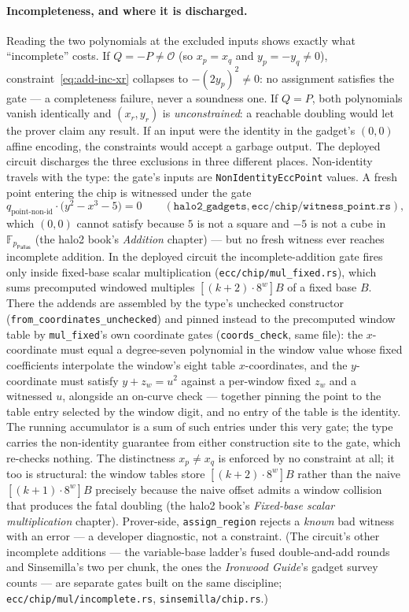 \documentclass[11pt,a4paper]{article}
\theoremstyle{definition}
\newcommand{\F}{\mathbb{F}}
\newcommand{\Pallas}{\ensuremath{\mathsf{Pallas}}}
\begin{document}
\paragraph{Incompleteness, and where it is discharged.}
Reading the two polynomials at the excluded inputs shows exactly what
``incomplete'' costs. If $Q = -P \neq \mathcal{O}$ (so $x_p = x_q$ and
$y_p = -y_q \neq 0$), constraint~\eqref{eq:add-inc-xr} collapses to
$-(2 y_p)^2 \neq 0$: no assignment satisfies the gate --- a completeness
failure, never a soundness one. If $Q = P$, both polynomials vanish
identically and $(x_r, y_r)$ is \emph{unconstrained}: a reachable doubling
would let the prover claim any result. If an input were the identity in the
gadget's $(0,0)$ affine encoding, the constraints would accept a garbage
output. The deployed circuit discharges the three exclusions in three
different places. Non-identity travels with the type: the gate's inputs
are \texttt{NonIdentityEccPoint} values. A fresh point entering the chip
is witnessed under the gate
\[
q_{\text{point-non-id}} \cdot \bigl( y^2 - x^3 - 5 \bigr) = 0
\qquad
(\texttt{halo2\_gadgets}, \texttt{ecc/chip/witness\_point.rs}),
\]
which $(0,0)$ cannot satisfy because $5$ is not a square and $-5$ is not a
cube in $\F_{p_{\Pallas}}$ (the halo2 book's \emph{Addition} chapter) ---
but no fresh witness ever reaches incomplete addition. In the deployed
circuit the incomplete-addition gate fires only inside fixed-base scalar
multiplication (\texttt{ecc/chip/mul\_fixed.rs}), which sums precomputed
windowed multiples $[(k+2) \cdot 8^w]B$ of a fixed base $B$. There the
addends are assembled by the type's unchecked constructor
(\texttt{from\_coordinates\_unchecked}) and pinned instead to the
precomputed window table by \texttt{mul\_fixed}'s own coordinate gates
(\texttt{coords\_check}, same file): the $x$-coordinate must equal a
degree-seven polynomial in the window value whose fixed coefficients
interpolate the window's eight table $x$-coordinates, and the
$y$-coordinate must satisfy $y + z_w = u^2$ against a per-window fixed
$z_w$ and a witnessed $u$, alongside an on-curve check --- together
pinning the point to the table entry selected by the window digit, and no
entry of the table is the identity. The running accumulator is a sum of
such entries under this very gate; the type carries the non-identity
guarantee from either construction site to the gate, which re-checks
nothing. The distinctness $x_p \neq x_q$ is enforced by no constraint at
all; it too is structural: the window tables store $[(k+2) \cdot 8^w]B$
rather than the naive $[(k+1) \cdot 8^w]B$ precisely because the naive
offset admits a window collision that produces the fatal doubling (the
halo2 book's \emph{Fixed-base scalar multiplication} chapter).
Prover-side, \texttt{assign\_region} rejects a \emph{known} bad witness
with an error --- a developer diagnostic, not a constraint. (The
circuit's other incomplete additions --- the variable-base
ladder's fused double-and-add rounds and Sinsemilla's two per chunk, the
ones the \emph{Ironwood Guide}'s gadget survey counts --- are separate gates
built on the same discipline; \texttt{ecc/chip/mul/\allowbreak incomplete.rs},
\texttt{sinsemilla/chip.rs}.)
\end{document}
